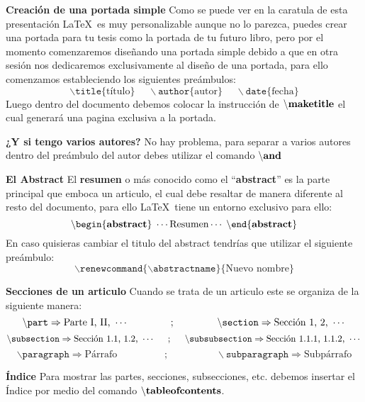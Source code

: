 \documentclass[aspectratio=169]{beamer}
\begin{document}
\begin{frame}{\bf Creación de una portada simple}
Como se puede ver en la caratula de esta presentación \LaTeX\ es muy personalizable aunque no lo parezca, puedes crear una portada para tu tesis como la portada de tu futuro libro, pero por el momento comenzaremos diseñando una portada simple debido a que en otra sesión nos dedicaremos exclusivamente al diseño de una portada, para ello comenzamos estableciendo los siguientes preámbulos:
$$\backslash\texttt{title}\{\text{título}\}~~~~~~\backslash\texttt{author}\{\text{autor}\}~~~~~~\backslash\texttt{date}\{\text{fecha}\}$$
Luego dentro del documento debemos colocar la instrucción de $\backslash\text{\bf maketitle}$ el cual generará una pagina exclusiva a la portada.

\begin{alertblock}{\bf ¿Y si tengo varios autores?}
No hay problema, para separar a varios autores dentro del preámbulo del autor debes utilizar el comando $\backslash\texttt{\bf and}$
\end{alertblock}

\end{frame}

\begin{frame}{\bf El Abstract}
El {\bf resumen} o más conocido como el ``{\bf abstract}'' es la parte principal que emboca un articulo, el cual debe resaltar de manera diferente al resto del documento, para ello \LaTeX\ tiene un entorno exclusivo para ello:
$$\backslash\texttt{begin}\{\text{\bf abstract}\}\;\cdots\text{Resumen}\cdots\;\backslash\texttt{end}\{\text{\bf abstract}\}$$
En caso quisieras cambiar el titulo del abstract tendrías que utilizar el siguiente preámbulo:
$$\backslash\texttt{renewcommand}\{\backslash\texttt{abstractname}\}\{\text{Nuevo nombre}\}$$

\end{frame}

\begin{frame}{\bf Secciones de un articulo}
Cuando se trata de un articulo este se organiza de la siguiente manera:
$$\backslash\texttt{part}\Rightarrow\text{Parte I, II, }\cdots \hspace{1.5cm};\hspace{1.5cm}\backslash\texttt{section}\Rightarrow\text{Sección 1, 2, }\cdots$$
$$\backslash\texttt{subsection}\Rightarrow\text{Sección 1.1, 1.2, }\cdots \hspace{0.5cm};\hspace{0.5cm}\backslash\texttt{subsubsection}\Rightarrow\text{Sección 1.1.1, 1.1.2, }\cdots$$
$$\backslash\texttt{paragraph}\Rightarrow\text{Párrafo} \hspace{2cm};\hspace{2cm}\backslash\texttt{subparagraph}\Rightarrow\text{Subpárrafo}$$

\begin{alertblock}{\bf Índice}
Para mostrar las partes, secciones, subsecciones, etc. debemos insertar el Índice por medio del comando $\backslash\texttt{\bf tableofcontents}$.
\end{alertblock}
\end{frame}
\end{document}

